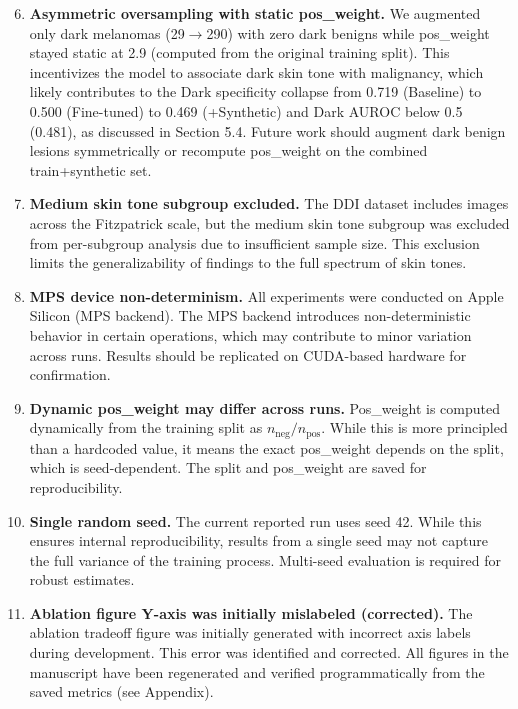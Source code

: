 \begin{enumerate}
    \setcounter{enumi}{5}
    \item \textbf{Asymmetric oversampling with static pos\_weight.} We augmented only dark melanomas (29$\to$290) with zero dark benigns while pos\_weight stayed static at 2.9 (computed from the original training split). This incentivizes the model to associate dark skin tone with malignancy, which likely contributes to the Dark specificity collapse from 0.719 (Baseline) to 0.500 (Fine-tuned) to 0.469 (+Synthetic) and Dark AUROC below 0.5 (0.481), as discussed in Section 5.4. Future work should augment dark benign lesions symmetrically or recompute pos\_weight on the combined train+synthetic set.

    \item \textbf{Medium skin tone subgroup excluded.} The DDI dataset includes images across the Fitzpatrick scale, but the medium skin tone subgroup was excluded from per-subgroup analysis due to insufficient sample size. This exclusion limits the generalizability of findings to the full spectrum of skin tones.

    \item \textbf{MPS device non-determinism.} All experiments were conducted on Apple Silicon (MPS backend). The MPS backend introduces non-deterministic behavior in certain operations, which may contribute to minor variation across runs. Results should be replicated on CUDA-based hardware for confirmation.

    \item \textbf{Dynamic pos\_weight may differ across runs.} Pos\_weight is computed dynamically from the training split as $n_{\text{neg}}/n_{\text{pos}}$. While this is more principled than a hardcoded value, it means the exact pos\_weight depends on the split, which is seed-dependent. The split and pos\_weight are saved for reproducibility.

    \item \textbf{Single random seed.} The current reported run uses seed 42. While this ensures internal reproducibility, results from a single seed may not capture the full variance of the training process. Multi-seed evaluation is required for robust estimates.

    \item \textbf{Ablation figure Y-axis was initially mislabeled (corrected).} The ablation tradeoff figure was initially generated with incorrect axis labels during development. This error was identified and corrected. All figures in the manuscript have been regenerated and verified programmatically from the saved metrics (see Appendix).


\end{enumerate}
